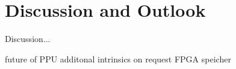 \chapter{Discussion and Outlook}
\label{chapter:discussion}

Discussion...


future of PPU
additonal intrinsics on request
FPGA speicher

